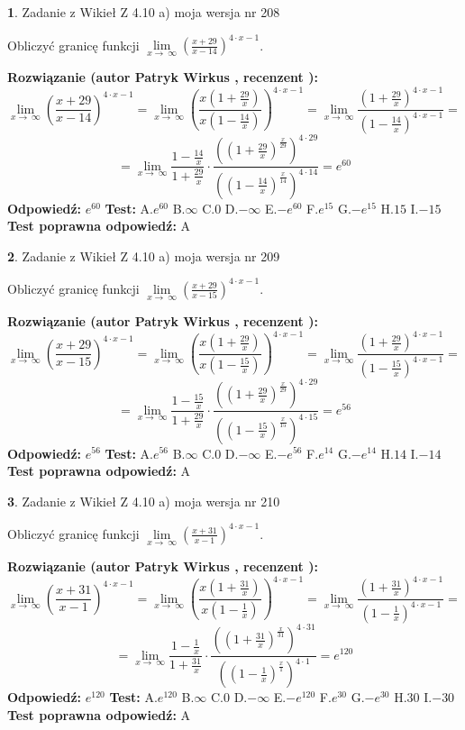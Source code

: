 \documentclass[12pt, a4paper]{article}
\theoremstyle{definition} %
\newtheorem{zad}{}
\newcommand{\zadStart}[1]{\begin{zad}#1\newline}
\newcommand{\zadStop}{\end{zad}}
\newcommand{\rozwStart}[2]{\noindent \textbf{Rozwiązanie (autor #1 , recenzent #2): }\newline}
\newcommand{\rozwStop}{\newline}
\newcommand{\odpStart}{\noindent \textbf{Odpowiedź:}\newline}
\newcommand{\odpStop}{\newline}
\newcommand{\testStart}{\noindent \textbf{Test:}\newline}
\newcommand{\testStop}{\newline}
\newcommand{\kluczStart}{\noindent \textbf{Test poprawna odpowiedź:}\newline}
\newcommand{\kluczStop}{\newline}
\begin{document}
\zadStart{Zadanie z Wikieł Z 4.10 a) moja wersja nr 208}

Obliczyć granicę funkcji  $\lim\limits_{x\to\ \infty}(\frac{x+29}{x-14})^{4\cdot x-1}$.
\zadStop
\rozwStart{Patryk Wirkus}{}
$$\lim\limits_{x\to\ \infty}(\frac{x+29}{x-14})^{4\cdot x-1} = \lim\limits_{x\to\ \infty}(\frac{x(1+\frac{29}{x})}{x(1-\frac{14}{x})})^{4\cdot x-1}=\lim\limits_{x\to\ \infty}\frac{(1+\frac{29}{x})^{4\cdot x-1}}{(1-\frac{14}{x})^{4\cdot x-1}}=$$
$$=\lim\limits_{x\to\ \infty}\frac{1-\frac{14}{x}}{1+\frac{29}{x}}\cdot\frac{((1+\frac{29}{x})^{\frac{x}{29}})^{4\cdot29}}{((1-\frac{14}{x})^{\frac{x}{14}})^{4\cdot14}}=e^{60}$$
\rozwStop
\odpStart
$e^{60}$
\odpStop
\testStart
A.$e^{60}$ B.$\infty$ C.$0$ D.$-\infty$ E.$-e^{60}$
F.$e^{15}$ G.$-e^{15}$
H.$15$
I.$-15$
\testStop
\kluczStart
A
\kluczStop



\zadStart{Zadanie z Wikieł Z 4.10 a) moja wersja nr 209}

Obliczyć granicę funkcji  $\lim\limits_{x\to\ \infty}(\frac{x+29}{x-15})^{4\cdot x-1}$.
\zadStop
\rozwStart{Patryk Wirkus}{}
$$\lim\limits_{x\to\ \infty}(\frac{x+29}{x-15})^{4\cdot x-1} = \lim\limits_{x\to\ \infty}(\frac{x(1+\frac{29}{x})}{x(1-\frac{15}{x})})^{4\cdot x-1}=\lim\limits_{x\to\ \infty}\frac{(1+\frac{29}{x})^{4\cdot x-1}}{(1-\frac{15}{x})^{4\cdot x-1}}=$$
$$=\lim\limits_{x\to\ \infty}\frac{1-\frac{15}{x}}{1+\frac{29}{x}}\cdot\frac{((1+\frac{29}{x})^{\frac{x}{29}})^{4\cdot29}}{((1-\frac{15}{x})^{\frac{x}{15}})^{4\cdot15}}=e^{56}$$
\rozwStop
\odpStart
$e^{56}$
\odpStop
\testStart
A.$e^{56}$ B.$\infty$ C.$0$ D.$-\infty$ E.$-e^{56}$
F.$e^{14}$ G.$-e^{14}$
H.$14$
I.$-14$
\testStop
\kluczStart
A
\kluczStop



\zadStart{Zadanie z Wikieł Z 4.10 a) moja wersja nr 210}

Obliczyć granicę funkcji  $\lim\limits_{x\to\ \infty}(\frac{x+31}{x-1})^{4\cdot x-1}$.
\zadStop
\rozwStart{Patryk Wirkus}{}
$$\lim\limits_{x\to\ \infty}(\frac{x+31}{x-1})^{4\cdot x-1} = \lim\limits_{x\to\ \infty}(\frac{x(1+\frac{31}{x})}{x(1-\frac{1}{x})})^{4\cdot x-1}=\lim\limits_{x\to\ \infty}\frac{(1+\frac{31}{x})^{4\cdot x-1}}{(1-\frac{1}{x})^{4\cdot x-1}}=$$
$$=\lim\limits_{x\to\ \infty}\frac{1-\frac{1}{x}}{1+\frac{31}{x}}\cdot\frac{((1+\frac{31}{x})^{\frac{x}{31}})^{4\cdot31}}{((1-\frac{1}{x})^{\frac{x}{1}})^{4\cdot1}}=e^{120}$$
\rozwStop
\odpStart
$e^{120}$
\odpStop
\testStart
A.$e^{120}$ B.$\infty$ C.$0$ D.$-\infty$ E.$-e^{120}$
F.$e^{30}$ G.$-e^{30}$
H.$30$
I.$-30$
\testStop
\kluczStart
A
\kluczStop
\end{document}
